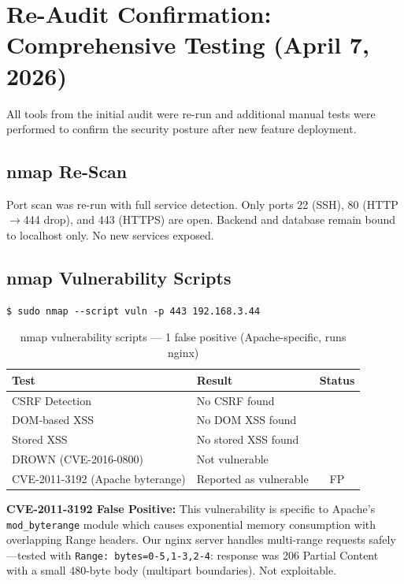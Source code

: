 \documentclass[12pt,a4paper]{article}
\newcommand{\pass}{\textcolor{success}{\checkmark}}
\begin{document}
\section{Re-Audit Confirmation: Comprehensive Testing (April 7, 2026)}

All tools from the initial audit were re-run and additional manual tests were performed to confirm the security posture after new feature deployment.

\subsection{nmap Re-Scan}

Port scan was re-run with full service detection. Only ports 22 (SSH), 80 (HTTP$\to$444 drop), and 443 (HTTPS) are open. Backend and database remain bound to localhost only. No new services exposed.

\subsection{nmap Vulnerability Scripts}

\begin{lstlisting}
$ sudo nmap --script vuln -p 443 192.168.3.44
\end{lstlisting}

\begin{table}[H]
\centering
\begin{tabular}{llc}
\toprule
\textbf{Test} & \textbf{Result} & \textbf{Status} \\
\midrule
CSRF Detection & No CSRF found & \pass \\
DOM-based XSS & No DOM XSS found & \pass \\
Stored XSS & No stored XSS found & \pass \\
DROWN (CVE-2016-0800) & Not vulnerable & \pass \\
CVE-2011-3192 (Apache byterange) & Reported as vulnerable & \textcolor{success}{FP} \\
\bottomrule
\end{tabular}
\caption{nmap vulnerability scripts --- 1 false positive (Apache-specific, runs nginx)}
\end{table}

\textbf{CVE-2011-3192 False Positive:} This vulnerability is specific to Apache's \texttt{mod\_byterange} module which causes exponential memory consumption with overlapping Range headers. Our nginx server handles multi-range requests safely---tested with \texttt{Range: bytes=0-5,1-3,2-4}: response was 206 Partial Content with a small 480-byte body (multipart boundaries). Not exploitable.
\end{document}
